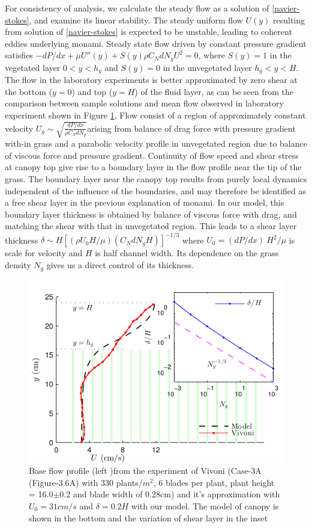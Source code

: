 \documentclass[aps,prl,twocolumn,showpacs,superscriptaddress,groupedaddress,10pt]{revtex4-1}  %
\newcommand{\hg}{h_g}
\begin{document}
For consistency of analysis, we calculate the steady flow as a solution of \eqref{navier-stokes}, and examine its linear stability. The steady uniform flow $U(y)$ resulting from solution of \eqref{navier-stokes} is expected to be unstable, leading to coherent eddies underlying monami. Steady state flow driven by constant pressure gradient satisfies
$-{dP}/{dx}+\mu U''(y) +S(y) \rho C_N d N_gU^2=0$, where $S(y)=1$ in the vegetated layer $0<y<\hg$ and $S(y)=0$ in the unvegetated layer $\hg< y< H$. 
The flow in the laboratory experiments is better approximated by zero shear at the bottom ($y=0$) and top ($y=H$) of the fluid layer, as can be seen from the comparison 
between sample solutions and mean flow observed in laboratory experiment shown in Figure \ref{fig:basicflow}. Flow consist of a region of approximately constant velocity
\small$U_g \sim \sqrt{\frac{dP/dx}{\rho C_N dN_g}}$\normalsize arising from balance of drag force with pressure gradient with-in grass and a parabolic velocity 
profile in unvegetated region due to balance of viscous force and pressure gradient. Continuity of flow speed and shear stress at canopy top 
give rise to a boundary layer in the flow profile near the tip of the grass. The boundary layer near the canopy top results from purely local dynamics independent of the influence of the boundaries, and may therefore be identified as a free shear layer\cite{Ghisal02} in the previous explanation of monami. 
In our model, this boundary layer thickness is obtained by balance of viscous force with drag, and matching the shear with that in unvegetated region. This leads to a shear layer 
thickness $\delta \sim  H\left[({\rho U_0 H}/\mu) (C_N d N_g H)\right]^{-1/3}$ where $U_0 = {(dP/dx)~H^2}/{\mu}$ is scale for velocity and
$H$ is half channel width. Its dependence on the grass density $N_g$ gives us a direct control of its thickness. 
\begin{figure}[htb]
  \includegraphics[scale=1]{Grass_Base_Vivoni_shear}
\caption{Base flow profile (left )from the experiment of Vivoni\cite{Vivoni98} (Case-3A (Figure-3.6A) with 330 plants/$m^2$, 6 blades per plant, 
plant height = 16.0$\pm0.2$ and blade width of 0.28cm)
 and it's approximation with $U_0=31cm/s$ and $\delta = 0.2H$ with our model. The model of canopy is shown in the bottom and the variation of shear layer in the inset }
\label{fig:basicflow}
\end{figure}
\end{document}
